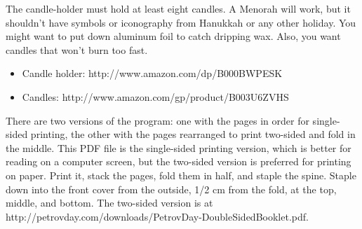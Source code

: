 \documentclass{article}
\begin{document}
The candle-holder must hold at least eight candles. A Menorah will work, but it
shouldn't have symbols or iconography from Hanukkah or any other holiday. You
might want to put down aluminum foil to catch dripping wax. Also, you want
candles that won't burn too fast.

\begin{itemize} \itemsep0pt \parskip0pt 
	\item Candle holder: http://www.amazon.com/dp/B000BWPESK
	\item Candles: http://www.amazon.com/gp/product/B003U6ZVHS
\end{itemize}

There are two versions of the program: one with the pages in order for
single-sided printing, the other with the pages rearranged to print two-sided
and fold in the middle. This PDF file is the single-sided printing version,
which is better for reading on a computer screen, but the two-sided version is
preferred for printing on paper. Print it, stack the pages, fold them in half,
and staple the spine. Staple down into the front cover from the outside, 1/2
cm from the fold, at the top, middle, and bottom. The two-sided version is at
http://petrovday.com/downloads/PetrovDay-DoubleSidedBooklet.pdf{}.
\end{document}
